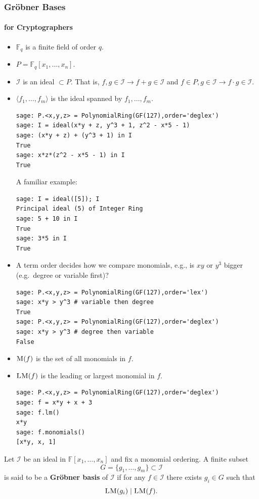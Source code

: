 \documentclass[9pt]{beamer}
\renewcommand{\emph}[1]{\textbf{\color{oxygenorange}#1}\xspace}
\newcommand{\field}[1]{\ensuremath{\mathbb{#1}}}
\newcommand{\M}[1]{\ensuremath{\textsc{M}(#1)\xspace}}
\newcommand{\LM}[1]{\ensuremath{\textsc{LM}(#1)\xspace}}
\newcommand{\ideal}[1]{\langle #1 \rangle}
\begin{document}
\begin{frame}
\frametitle{Gröbner Bases}
\framesubtitle{for Cryptographers} 

\begin{itemize}
 \item $\field{F}_q$ is a finite field of order $q$.
 \item $P = \field{F}_q[x_1,\dots,x_{n}]$.
 \item $\mathcal{I}$ is an ideal $ \subset P$. That is, $f,g \in \mathcal{I} \rightarrow f + g \in \mathcal{I}$ and $f \in P, g \in \mathcal{I} \rightarrow f \cdot g \in \mathcal{I}.$
 \item $\ideal{f_1,\dots,f_{m}}$ is the ideal spanned by $f_1,\dots,f_{m}$.
\begin{lstlisting}
sage: P.<x,y,z> = PolynomialRing(GF(127),order='deglex')
sage: I = ideal(x*y + z, y^3 + 1, z^2 - x*5 - 1)
sage: (x*y + z) + (y^3 + 1) in I
True
sage: x*z*(z^2 - x*5 - 1) in I
True
\end{lstlisting}

A familiar example:
\begin{lstlisting}
sage: I = ideal([5]); I
Principal ideal (5) of Integer Ring
sage: 5 + 10 in I
True
sage: 3*5 in I
True
\end{lstlisting}



\framebreak 
 \item A term order decides how we compare monomials, e.g., is $xy$ or $y^3$ bigger\\(e.g.\ degree or variable first)?
\begin{lstlisting}
sage: P.<x,y,z> = PolynomialRing(GF(127),order='lex')
sage: x*y > y^3 # variable then degree
True
sage: P.<x,y,z> = PolynomialRing(GF(127),order='deglex')
sage: x*y > y^3 # degree then variable
False
\end{lstlisting}
 \item $\M{f}$ is the set of all monomials in $f$.
 \item $\LM{f}$ is the leading or largest monomial in $f$.
\begin{lstlisting}
sage: P.<x,y,z> = PolynomialRing(GF(127),order='deglex')
sage: f = x*y + x + 3
sage: f.lm()
x*y
sage: f.monomials()
[x*y, x, 1]
\end{lstlisting}
\end{itemize}

\framebreak

\begin{definition}
Let $\mathcal{I}$ be an ideal in $\field{F}[x_1,\dots,x_{n}]$ and fix a monomial ordering. A finite subset $$G = \{g_1 ,\dots , g_{m} \} \subset \mathcal{I}$$  is said to be a \emph{Gr\"obner basis} of $\mathcal{I}$ if for any $f \in \mathcal{I}$ there exists $g_i \in G$ such that $$\LM{g_i} \mid \LM{f}.$$
\end{definition}


\end{frame}
\end{document}
